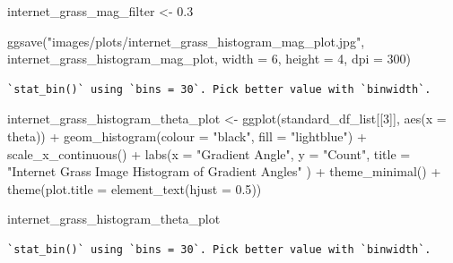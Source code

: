 \documentclass[
  letterpaper,
]{report}
\newenvironment{Shaded}{\begin{snugshade}}{\end{snugshade}}
\newcommand{\AttributeTok}[1]{\textcolor[rgb]{0.40,0.45,0.13}{#1}}
\newcommand{\DecValTok}[1]{\textcolor[rgb]{0.68,0.00,0.00}{#1}}
\newcommand{\FloatTok}[1]{\textcolor[rgb]{0.68,0.00,0.00}{#1}}
\newcommand{\FunctionTok}[1]{\textcolor[rgb]{0.28,0.35,0.67}{#1}}
\newcommand{\NormalTok}[1]{\textcolor[rgb]{0.00,0.23,0.31}{#1}}
\newcommand{\OtherTok}[1]{\textcolor[rgb]{0.00,0.23,0.31}{#1}}
\newcommand{\SpecialCharTok}[1]{\textcolor[rgb]{0.37,0.37,0.37}{#1}}
\newcommand{\StringTok}[1]{\textcolor[rgb]{0.13,0.47,0.30}{#1}}
\begin{document}
\begin{Shaded}
\begin{Highlighting}[]
\NormalTok{internet\_grass\_mag\_filter }\OtherTok{\textless{}{-}} \FloatTok{0.3}

\FunctionTok{ggsave}\NormalTok{(}\StringTok{"images/plots/internet\_grass\_histogram\_mag\_plot.jpg"}\NormalTok{, internet\_grass\_histogram\_mag\_plot, }\AttributeTok{width =} \DecValTok{6}\NormalTok{, }\AttributeTok{height =} \DecValTok{4}\NormalTok{, }\AttributeTok{dpi =} \DecValTok{300}\NormalTok{)}
\end{Highlighting}
\end{Shaded}

\begin{verbatim}
`stat_bin()` using `bins = 30`. Pick better value with `binwidth`.
\end{verbatim}

\begin{Shaded}
\begin{Highlighting}[]
\NormalTok{internet\_grass\_histogram\_theta\_plot }\OtherTok{\textless{}{-}}
  \FunctionTok{ggplot}\NormalTok{(standard\_df\_list[[}\DecValTok{3}\NormalTok{]], }
         \FunctionTok{aes}\NormalTok{(}\AttributeTok{x =}\NormalTok{ theta)) }\SpecialCharTok{+}
  \FunctionTok{geom\_histogram}\NormalTok{(}\AttributeTok{colour =} \StringTok{"black"}\NormalTok{, }\AttributeTok{fill =} \StringTok{"lightblue"}\NormalTok{) }\SpecialCharTok{+}
  \FunctionTok{scale\_x\_continuous}\NormalTok{() }\SpecialCharTok{+} 
  \FunctionTok{labs}\NormalTok{(}\AttributeTok{x =} \StringTok{"Gradient Angle"}\NormalTok{, }
       \AttributeTok{y =} \StringTok{"Count"}\NormalTok{, }
       \AttributeTok{title =} \StringTok{"Internet Grass Image Histogram of Gradient Angles"}
\NormalTok{       ) }\SpecialCharTok{+}
  \FunctionTok{theme\_minimal}\NormalTok{() }\SpecialCharTok{+}
  \FunctionTok{theme}\NormalTok{(}\AttributeTok{plot.title =} \FunctionTok{element\_text}\NormalTok{(}\AttributeTok{hjust =} \FloatTok{0.5}\NormalTok{))}

\NormalTok{internet\_grass\_histogram\_theta\_plot}
\end{Highlighting}
\end{Shaded}

\begin{verbatim}
`stat_bin()` using `bins = 30`. Pick better value with `binwidth`.
\end{verbatim}
\end{document}
